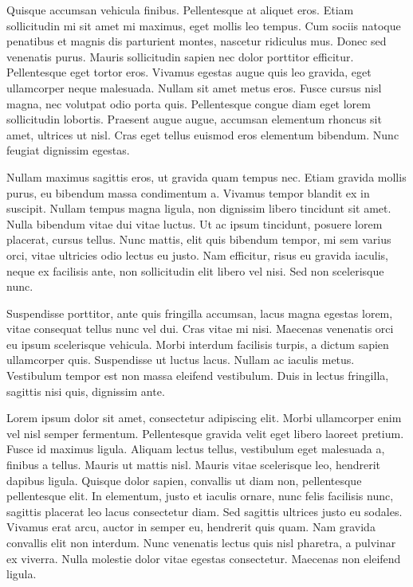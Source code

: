 \documentclass[nocopyrightspace]{acm_proc_article-sp}
\begin{document}
Quisque accumsan vehicula finibus. Pellentesque at aliquet eros. Etiam sollicitudin mi sit amet mi maximus, eget mollis leo tempus. Cum sociis natoque penatibus et magnis dis parturient montes, nascetur ridiculus mus. Donec sed venenatis purus. Mauris sollicitudin sapien nec dolor porttitor efficitur. Pellentesque eget tortor eros. Vivamus egestas augue quis leo gravida, eget ullamcorper neque malesuada. Nullam sit amet metus eros. Fusce cursus nisl magna, nec volutpat odio porta quis. Pellentesque congue diam eget lorem sollicitudin lobortis. Praesent augue augue, accumsan elementum rhoncus sit amet, ultrices ut nisl. Cras eget tellus euismod eros elementum bibendum. Nunc feugiat dignissim egestas.

Nullam maximus sagittis eros, ut gravida quam tempus nec. Etiam gravida mollis purus, eu bibendum massa condimentum a. Vivamus tempor blandit ex in suscipit. Nullam tempus magna ligula, non dignissim libero tincidunt sit amet. Nulla bibendum vitae dui vitae luctus. Ut ac ipsum tincidunt, posuere lorem placerat, cursus tellus. Nunc mattis, elit quis bibendum tempor, mi sem varius orci, vitae ultricies odio lectus eu justo. Nam efficitur, risus eu gravida iaculis, neque ex facilisis ante, non sollicitudin elit libero vel nisi. Sed non scelerisque nunc.

Suspendisse porttitor, ante quis fringilla accumsan, lacus magna egestas lorem, vitae consequat tellus nunc vel dui. Cras vitae mi nisi. Maecenas venenatis orci eu ipsum scelerisque vehicula. Morbi interdum facilisis turpis, a dictum sapien ullamcorper quis. Suspendisse ut luctus lacus. Nullam ac iaculis metus. Vestibulum tempor est non massa eleifend vestibulum. Duis in lectus fringilla, sagittis nisi quis, dignissim ante.

Lorem ipsum dolor sit amet, consectetur adipiscing elit. Morbi ullamcorper enim vel nisl semper fermentum. Pellentesque gravida velit eget libero laoreet pretium. Fusce id maximus ligula. Aliquam lectus tellus, vestibulum eget malesuada a, finibus a tellus. Mauris ut mattis nisl. Mauris vitae scelerisque leo, hendrerit dapibus ligula. Quisque dolor sapien, convallis ut diam non, pellentesque pellentesque elit. In elementum, justo et iaculis ornare, nunc felis facilisis nunc, sagittis placerat leo lacus consectetur diam. Sed sagittis ultrices justo eu sodales. Vivamus erat arcu, auctor in semper eu, hendrerit quis quam. Nam gravida convallis elit non interdum. Nunc venenatis lectus quis nisl pharetra, a pulvinar ex viverra. Nulla molestie dolor vitae egestas consectetur. Maecenas non eleifend ligula.

\balancecolumns
\end{document}
